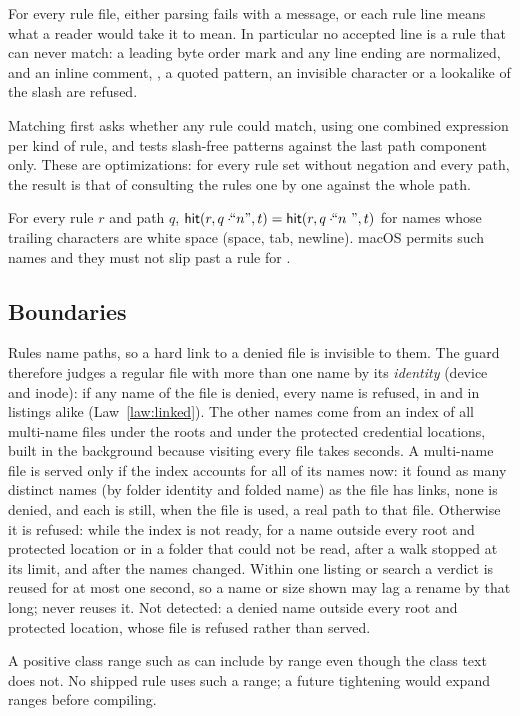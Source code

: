 \begin{law}
\label{law:rule-file}
For every rule file, either parsing fails with a message, or each rule line means
what a reader would take it to mean.  In particular no accepted line is a rule that
can never match: a leading byte order mark and any line ending are normalized, and
an inline comment, , a quoted pattern, an invisible character or a
lookalike of the slash are refused.
\end{law}

\begin{law}
\label{law:fast-path}
Matching first asks whether any rule could match, using one combined expression
per kind of rule, and tests slash-free patterns against the last path component
only.  These are optimizations: for every rule set without negation and every
path, the result is that of consulting the rules one by one against the whole
path.
\end{law}

\begin{law}
\label{law:tail}
For every rule $r$ and path $q$, $\mathsf{hit}(r,q\cdot\!\!\text{``}n\text{''},t)=
\mathsf{hit}(r,q\cdot\!\!\text{``}n\ \text{''},t)$ for names whose trailing characters
are white space (space, tab, newline).  macOS permits such names and they must
not slip past a rule for .
\end{law}

\subsection{Boundaries}

\begin{boundary}
Rules name paths, so a hard link to a denied file is invisible to them.  The guard
therefore judges a regular file with more than one name by its \emph{identity}
(device and inode): if any name of the file is denied, every name is refused, in
 and in listings alike (Law~\ref{law:linked}).  The other names come
from an index of all multi-name files under the roots and under the protected
credential locations, built in the background because visiting every file takes
seconds.  A multi-name file is served only if the index accounts for all of its
names now: it found as many distinct names (by folder identity and folded name) as
the file has links, none is denied, and each is still, when the file is used, a real
path to that file.  Otherwise it is refused: while the index is not ready, for a
name outside every root and protected location or in a folder that could not be
read, after a walk stopped at its limit, and after the names changed.  Within one
listing or search a verdict is reused for at most one second, so a name or size
shown may lag a rename by that long;  never reuses it.  Not detected:
a denied name outside every root and protected location, whose file is refused
rather than served.
\end{boundary}

\begin{boundary}
A positive class range such as \code{[+-0]} can include \code{/} by range even
though the class text does not.  No shipped rule uses such a range; a future
tightening would expand ranges before compiling.
\end{boundary}

